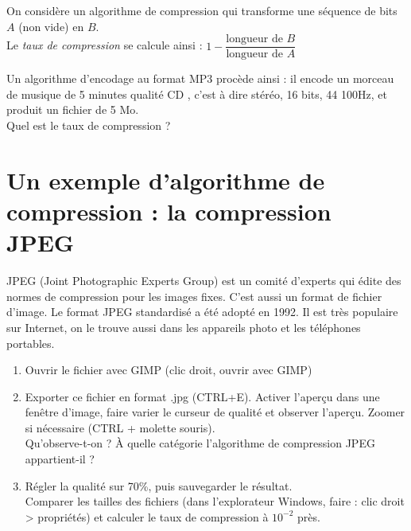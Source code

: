 \documentclass[a4paper,12pt,french]{book}
\newcommand{\file}[1]{\tw{#1}}
\begin{document}
\begin{definition}
	On  considère un algorithme de compression qui transforme une séquence de bits $A$ (non vide) en $B$.\\
	Le \textit{taux de compression} se calcule ainsi : $1-\dfrac{\text{longueur de }B}{\text{longueur de }A}$	
\end{definition}
	
\begin{exercice}
Un algorithme d'encodage au format MP3 procède ainsi : il encode un morceau de musique de 5 minutes \og qualité CD \fg{}, c'est à dire stéréo, 16 
bits, 44 100Hz, et produit un fichier de 5 Mo.\\
Quel est le taux de compression ?
\end{exercice}

\section{Un exemple d'algorithme de compression : la compression JPEG}

	JPEG (Joint Photographic Experts Group) est un comité d'experts qui édite des normes de compression pour les images fixes. C'est aussi un format 
	de fichier d'image.
	Le format JPEG standardisé a été adopté en 1992. Il est très populaire sur Internet, on le trouve aussi dans les appareils photo et les 
	téléphones portables.\\
	
\begin{exercice}
	\begin{enumerate}[--]
		\item 	Ouvrir le fichier \file{tricoloring.png} avec GIMP (clic droit, ouvrir avec GIMP)
		\item 	Exporter ce fichier en format .jpg (CTRL+E). Activer l'aperçu dans une fenêtre d'image, faire varier le curseur de qualité et 
		observer l'aperçu. Zoomer si nécessaire (CTRL + molette souris).\\
		Qu'observe-t-on ? \`A quelle catégorie l'algorithme de compression JPEG appartient-il ?

		\item 	Régler la qualité sur 70\%, puis sauvegarder le résultat.\\
				Comparer les tailles des fichiers (dans l'explorateur Windows, faire : clic droit > propriétés) et calculer le taux de compression à 
				$10^{-2}$ près.\\
	\end{enumerate}
\end{exercice}
\end{document}
